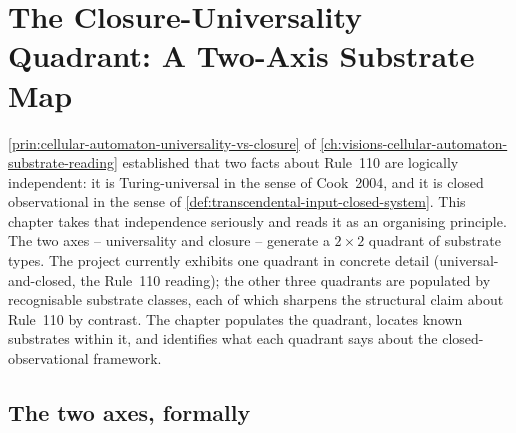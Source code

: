 \chapter{The Closure-Universality Quadrant: A Two-Axis Substrate Map}
\label{ch:visions-closure-universality-quadrant}

\autoref{prin:cellular-automaton-universality-vs-closure} of \autoref{ch:visions-cellular-automaton-substrate-reading} established that two facts about Rule~110 are logically independent: it is Turing-universal in the sense of Cook~2004, and it is closed observational in the sense of \autoref{def:transcendental-input-closed-system}. This chapter takes that independence seriously and reads it as an organising principle. The two axes -- universality and closure -- generate a $2 \times 2$ quadrant of substrate types. The project currently exhibits one quadrant in concrete detail (universal-and-closed, the Rule~110 reading); the other three quadrants are populated by recognisable substrate classes, each of which sharpens the structural claim about Rule~110 by contrast. The chapter populates the quadrant, locates known substrates within it, and identifies what each quadrant says about the closed-observational framework.

\section{The two axes, formally}
\label{sec:quadrant-axes}

